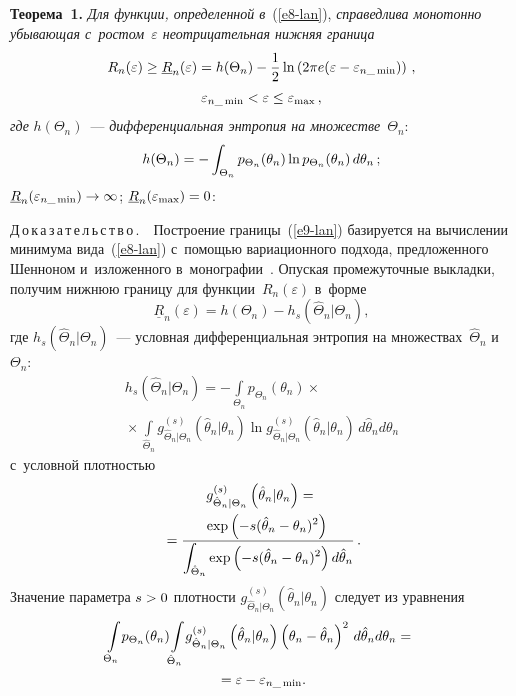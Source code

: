 \begin{multicols}{2}
\smallskip

\noindent
\textbf{Теорема~1.} \textit{Для функции, определенной в}~(\ref{e8-lan}), \textit{справедлива 
монотонно убывающая с~ростом~$\varepsilon$ неотрицательная ниж\-няя граница} 
\begin{multline}
R_n(\varepsilon) \geq \underline{R}_n(\varepsilon) =h(\Theta_n) -\displaystyle\frac{\displaystyle 1\mathstrut}{\displaystyle 2\mathstrut} \ln \left( 2\pi e 
(\varepsilon - \varepsilon_{n\_\min} ) \right)\,,\\
 \varepsilon_{n\_\min} <\varepsilon \leq 
\varepsilon_{\max}\,,
\label{e9-lan}
\end{multline}
\textit{где} $h(\Theta_n) $~---  \textit{дифференциальная энтропия на множестве}~$\Theta_n$: 
$$h(\Theta_n) \hm= -\int\nolimits_{\Theta_n} p_{\Theta_n} (\theta_n) \ln p_{\Theta_n} 
(\theta_n) \,d\theta_n\,;
$$
$\underline{R}_n(\varepsilon_{n\_\min}) \hm\to \infty$;   
$\underline{R}_n(\varepsilon_{\max} )\hm=0$:



\smallskip

\noindent
Д\,о\,к\,а\,з\,а\,т\,е\,л\,ь\,с\,т\,в\,о\,.\ \ Построение границы~(\ref{e9-lan}) базируется на 
вычислении минимума вида~(\ref{e8-lan}) с~по\-мощью вариационного подхода, 
предложенного Шенноном и~изложенного в~монографии~\cite{9-lan}. Опуская промежуточные 
выкладки, получим ниж\-нюю границу для функции~$R_n(\varepsilon)$ в~форме 
\begin{equation}
\underline{R}_n(\varepsilon) =h(\Theta_n) -h_s \left(\hat{\Theta}_n\vert \Theta_n\right),
\label{e10-lan}
\end{equation}
где $h_s(\hat{\Theta}_n\vert \Theta_n)$~--- 
условная дифференциальная энт\-ро\-пия на множествах~$\hat{\Theta}_n$ 
и~$\Theta_n$:
\begin{multline*}
h_s\left(\hat{\Theta}_n\vert \Theta_n\right)= -\int\limits_{\Theta_n} p_{\Theta_n}(\theta_n) \times{}\\
{}\times
\int\limits_{\hat{\Theta}_n} g^{(s)}_{\hat{\Theta}_n\vert \Theta_n} (\hat{\theta}_n\vert \theta_n) 
\ln g^{(s)}_{\hat{\Theta}_n\vert \Theta_n} (\hat{\theta}_n\vert \theta_n)\,d\hat{\theta}_n 
d\theta_n
\end{multline*}
 с~условной плот\-ностью 
\begin{multline}
g^{(s)}_{\hat{\Theta}_n\vert \Theta_n} \left(\hat{\theta}_n\vert \theta_n\right) ={}\\
{}=\displaystyle\frac{\displaystyle \exp \left(-s(\hat{\theta}_n-
\theta_n)^2\right)\mathstrut}{\displaystyle \int\nolimits_{\hat{\Theta}_n} \exp \left( -s ( \hat{\theta}_n-\theta_n)^2\right) 
d\hat{\theta}_n\mathstrut}\,.
\label{e11-lan}
\end{multline}
Значение параметра $s\hm> 0$ плот\-ности $g^{(s)}_{\hat{\Theta}_n\vert \Theta_n} 
(\hat{\theta}_n\vert\theta_n)$ следует из уравнения 
\begin{multline*}
\!\int\limits_{\Theta_n} \! p_{\Theta_n} (\theta_n) \!\int\limits_{\hat{\Theta}_n} \!
g^{(s)}_{\hat{\Theta}_n\vert \Theta_n}\left( \hat{\theta}_n\vert \theta_n\right) \left(\theta_n-\hat{\theta}_n\right)^2 \,d\hat{\theta}_n d\theta_n 
={}\hspace*{-0.47pt}\\
{}=\varepsilon- \varepsilon_{n\_\min}.
\end{multline*}


\end{multicols}
